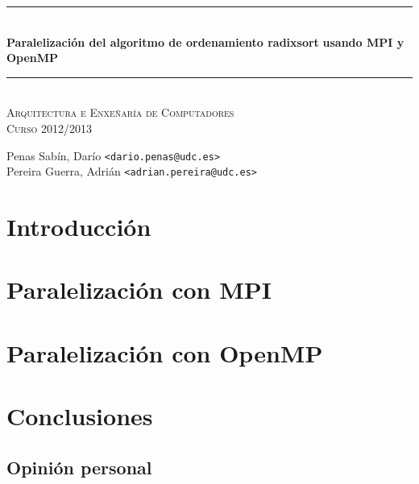\documentclass[a4paper]{article}
\newcommand{\HRule}{\rule{\linewidth}{0.5mm}}
\begin{document}
		\begin{center}

			\HRule \\[0.4cm]
			{ \huge \bfseries Paralelización del algoritmo de ordenamiento radixsort}
      \vspace{0.2cm}
      { \huge \bfseries usando MPI y OpenMP}\\[0.4cm]
			\HRule \\[0cm]

			\vspace{1cm}
			\textsc{\Large Arquitectura e Enxeñaría de Computadores}\\[0.5cm]
			\textsc{\Large Curso 2012/2013}\\[0.5cm]

		\end{center}


		\vspace{2cm}

		\begin{center}
		Penas Sabín, Darío \texttt{<dario.penas@udc.es>}\\
		\vspace{0.1cm}
		Pereira Guerra, Adrián \texttt{<adrian.pereira@udc.es>}\\		
		\end{center}
		\vspace{2cm}


\tableofcontents
\vspace{3cm}
\clearpage

\section{Introducción}
  	
\section{Paralelización con MPI}
	
\section{Paralelización con OpenMP}
%	
\section{Conclusiones}
%	
\subsection{Opinión personal}
%	
\end{document}
